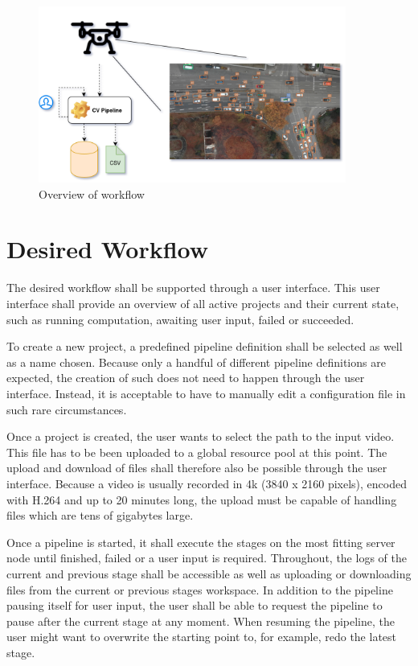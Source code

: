 \begin{figure}[H]
	\centering
	\includegraphics[width=0.9\textwidth]{overview_3.png}
	\caption{Overview of workflow}
\end{figure}

\section{Desired Workflow}
\label{workflow}

The desired workflow shall be supported through a  user interface.
This user interface shall provide an overview of all active projects and their current state, such as running computation, awaiting user input, failed or succeeded.

To create a new project, a predefined pipeline definition shall be selected as well as a name chosen.
Because only a handful of different pipeline definitions are expected, the creation of such does not need to happen through the user interface.
Instead, it is acceptable to have to manually edit a configuration file in such rare circumstances.

Once a project is created, the user wants to select the path to the input video.
This file has to be been uploaded to a global resource pool at this point.
The upload and download of files shall therefore also be possible through the user interface.
Because a video is usually recorded in 4k (3840 x 2160 pixels), encoded with H.264 and up to 20 minutes long, the upload must be capable of handling files which are tens of gigabytes large.

Once a pipeline is started, it shall execute the stages on the most fitting server node until finished, failed or a user input is required.
Throughout, the logs of the current and previous stage shall be accessible as well as uploading or downloading files from the current or previous stages workspace.
In addition to the pipeline pausing itself for user input, the user shall be able to request the pipeline to pause after the current stage at any moment.
When resuming the pipeline, the user might want to overwrite the starting point to, for example, redo the latest stage.

